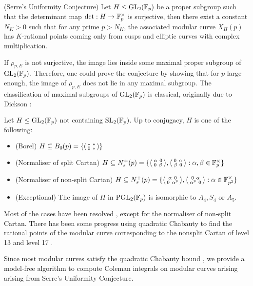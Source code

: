 \begin{conj}{(Serre's Uniformity Conjecture)}
    Let $H \leq \operatorname{GL}_2(\mathbb{F}_p)$ be a proper subgroup such that the determinant map $\det: H \rightarrow \mathbb{F}_p^\times$ is surjective, then there exist a constant $N_K>0$ such that for any prime $p> N_K$, the associated modular curve $X_H(p)$ has $K$-rational points coming only from cusps and elliptic curves with complex multiplication.
\end{conj}


If $\rho_{p,E}$ is not surjective, the image lies inside some maximal proper subgroup of $\operatorname{GL}_2(\mathbb{F}_p)$. Therefore, one could prove the conjecture by showing that for $p$ large enough, the image of $\rho_{p,E}$ does not lie in any maximal subgroup. The classification of maximal subgroups of $\operatorname{GL}_2(\mathbb{F}_p)$ is classical, originally due to Dickson \cite{dickson}:

\begin{theorem}
    Let $H \leq \operatorname{GL}_2(\mathbb{F}_p)$ not containing $\operatorname{SL}_2(\mathbb{F}_p)$. Up to conjugacy, $H$ is one of the following:
    \begin{itemize}
        \item (Borel) $H \subseteq B_0(p) = \{ \begin{psmallmatrix} \ast \ \ast \\ 0 \ \ast \end{psmallmatrix} \}$ 
        \item (Normaliser of split Cartan) $H \subseteq N_s^+(p) = \{ \begin{psmallmatrix} \alpha \ 0 \\ 0 \ \beta \end{psmallmatrix}, \begin{psmallmatrix} 0 \ \alpha \\ \beta \ 0 \end{psmallmatrix}: \alpha,\beta \in \mathbb{F}_p^\times \}$ 
        \item (Normaliser of non-split Cartan) $H \subseteq N_s^+(p) = \{ \begin{psmallmatrix} \alpha \ 0 \\ 0 \ \alpha^p \end{psmallmatrix}, \begin{psmallmatrix} 0 \ \alpha \\ \alpha^p \ 0 \end{psmallmatrix}: \alpha \in \mathbb{F}_{p^2}^\times \}$ 
        \item (Exceptional) The image of $H$ in $\operatorname{PGL}_2(\mathbb{F}_p)$ is isomorphic to $A_4,S_4$ or $A_5$.
    \end{itemize}
\end{theorem}

Most of the cases have been resolved \cite{borel,BP1,BP2,serre72}, except for the normaliser of non-split Cartan. There has been some progress using quadratic Chabauty to find the rational points of the modular curve corresponding to the nonsplit Cartan of level 13 \cite{cursed-curve} and level 17 \cite{BDMTV}.

Since most modular curves satisfy the quadratic Chabauty bound \cite{Siksek}, we provide a model-free algorithm to compute Coleman integrals on modular curves arising  arising from Serre's Uniformity Conjecture.
